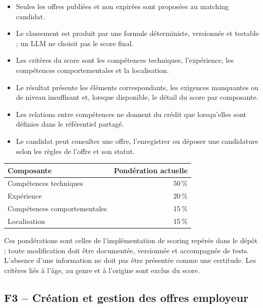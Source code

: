 \documentclass[11pt,a4paper]{article}
\begin{document}
\begin{itemize}
  \item Seules les offres publiées et non expirées sont proposées au matching candidat.
  \item Le classement est produit par une formule déterministe, versionnée et testable ; un LLM ne choisit pas le score final.
  \item Les critères du score sont les compétences techniques, l'expérience, les compétences comportementales et la localisation.
  \item Le résultat présente les éléments correspondants, les exigences manquantes ou de niveau insuffisant et, lorsque disponible, le détail du score par composante.
  \item Les relations entre compétences ne donnent du crédit que lorsqu'elles sont définies dans le référentiel partagé.
  \item Le candidat peut consulter une offre, l'enregistrer ou déposer une candidature selon les règles de l'offre et son statut.
\end{itemize}

\begin{center}
\begin{tabularx}{0.78\textwidth}{Xr}
\toprule
\textbf{Composante} & \textbf{Pondération actuelle}\\
\midrule
Compétences techniques & 50\,\%\\
Expérience & 20\,\%\\
Compétences comportementales & 15\,\%\\
Localisation & 15\,\%\\
\bottomrule
\end{tabularx}
\end{center}

Ces pondérations sont celles de l'implémentation de scoring repérée dans le dépôt ; toute modification doit être documentée, versionnée et accompagnée de tests. L'absence d'une information ne doit pas être présentée comme une certitude. Les critères liés à l'âge, au genre et à l'origine sont exclus du score.

\subsection{F3 -- Création et gestion des offres employeur}
\end{document}
